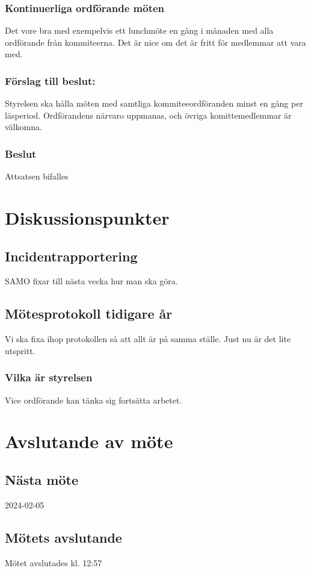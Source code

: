 \documentclass[protokoll]{dvd}
\begin{document}
\subsubsection*{Kontinuerliga ordförande möten}
Det vore bra med exempelvis ett lunchmöte en gång i månaden med alla ordförande från kommiteerna. Det är nice om det är fritt för medlemmar att vara med.
\subsubsection*{Förslag till beslut:}
\begin{attsatser}
    \item Styrelsen ska hålla möten med samtliga kommiteeordföranden minst en gång per läsperiod. Ordförandens närvaro uppmanas, och övriga komittemedlemmar är välkomna.
\end{attsatser}

\subsubsection*{Beslut}
\begin{attsatser}
    \item Attsatsen bifalles
\end{attsatser}


\section{Diskussionspunkter}

\subsection*{Incidentrapportering}
SAMO fixar till nästa vecka hur man ska göra.

\subsection*{Mötesprotokoll tidigare år}
Vi ska fixa ihop protokollen så att allt är på samma ställe. Just nu är det lite utspritt.

\subsubsection*{Vilka är styrelsen}
Vice ordförande kan tänka sig fortsätta arbetet.


\newpage
\section{Avslutande av möte}

\subsection{Nästa möte}
2024-02-05

\subsection{Mötets avslutande}
Mötet avslutades kl. 12:57

\styrelsesignaturer
\end{document}
